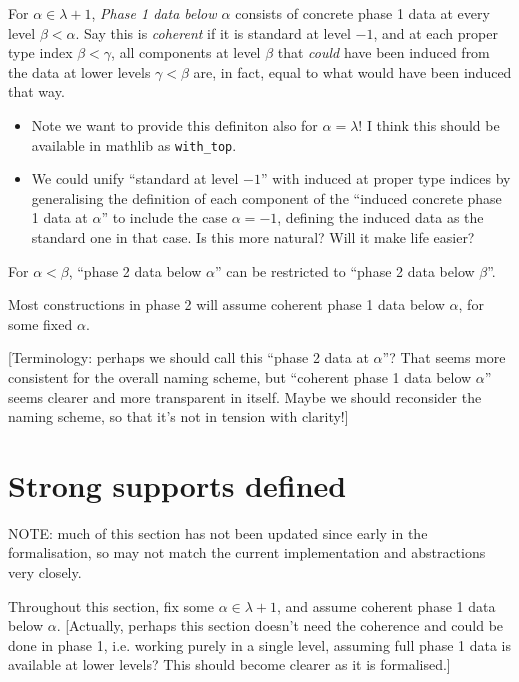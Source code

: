 \begin{definition}
  \label{def:coherent-phase-1-data}
  For $\alpha \in \lambda + 1$, \emph{Phase 1 data below $\alpha$} consists of concrete phase 1 data at every level $\beta < \alpha$.  Say this is \emph{coherent} if it is standard at level $-1$, and at each proper type index $\beta < \gamma$, all components at level $\beta$ that \emph{could} have been induced from the data at lower levels $\gamma < \beta$ are, in fact, equal to what would have been induced that way.

  \begin{itemize}
  \item Note we want to provide this definiton also for $\alpha = \lambda$!  I think this should be available in mathlib as \verb|with_top|.
  \item We could unify “standard at level $-1$” with induced at proper type indices by generalising the definition of each component of the “induced concrete phase 1 data at $\alpha$” to include the case $\alpha = -1$, defining the induced data as the standard one in that case.  Is this more natural?  Will it make life easier?
  \end{itemize}

  For $\alpha < \beta$, “phase 2 data below $\alpha$” can be restricted to “phase 2 data below $\beta$”.

  Most constructions in phase 2 will assume coherent phase 1 data below $\alpha$, for some fixed $\alpha$.

  [Terminology: perhaps we should call this “phase 2 data at $\alpha$”?  That seems more consistent for the overall naming scheme, but “coherent phase 1 data below $\alpha$” seems clearer and more transparent in itself.  Maybe we should reconsider the naming scheme, so that it’s not in tension with clarity!]
\end{definition}

\section{Strong supports defined}

NOTE: much of this section has not been updated since early in the formalisation, so may not match the current implementation and abstractions very closely.

Throughout this section, fix some $\alpha \in \lambda + 1$, and assume coherent phase 1 data below $\alpha$. [Actually, perhaps this section doesn’t need the coherence and could be done in phase 1, i.e. working purely in a single level, assuming full phase 1 data is available at lower levels?  This should become clearer as it is formalised.]

